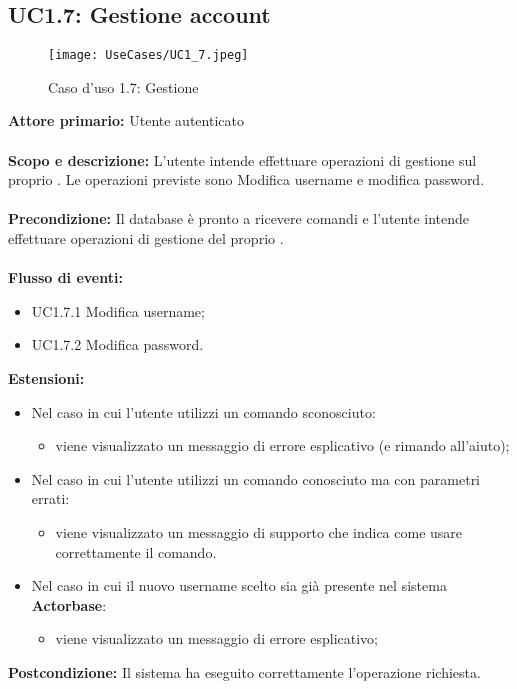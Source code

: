 \documentclass{scalatekids-article}
\begin{document}
\subsection{UC1.7: Gestione account}
\begin{figure}[H]
  \begin{center}
    \texttt{[image: UseCases/UC1\_7.jpeg]}
    \caption{Caso d'uso 1.7: Gestione }
  \end{center}
\end{figure}
\textbf{Attore primario:} Utente autenticato\\ \\
\textbf{Scopo e descrizione:} L'utente intende effettuare operazioni di gestione sul proprio . Le operazioni previste sono
Modifica username e modifica password.\\ \\
\textbf{Precondizione:} Il database è pronto a ricevere comandi e l'utente intende effettuare operazioni di gestione del proprio .\\ \\
\textbf{Flusso di eventi:}
\begin{itemize}
\item UC1.7.1 Modifica username;
\item UC1.7.2 Modifica password.
\end{itemize}
\textbf{Estensioni:}
\begin{itemize}
\item Nel caso in cui l'utente utilizzi un comando sconosciuto:
  \begin{itemize}
  \item viene visualizzato un messaggio di errore esplicativo (e rimando all'aiuto);
  \end{itemize}
\item Nel caso in cui l'utente utilizzi un comando conosciuto ma con parametri errati:
  \begin{itemize}
  \item viene visualizzato un messaggio di supporto che indica come usare correttamente il comando.
  \end{itemize}
\item Nel caso in cui il nuovo username scelto sia già presente nel sistema \textbf{Actorbase}:
  \begin{itemize}
  \item viene visualizzato un messaggio di errore esplicativo;
  \end{itemize}
\end{itemize}
\textbf{Postcondizione:} Il sistema ha eseguito correttamente l'operazione richiesta.
\end{document}
